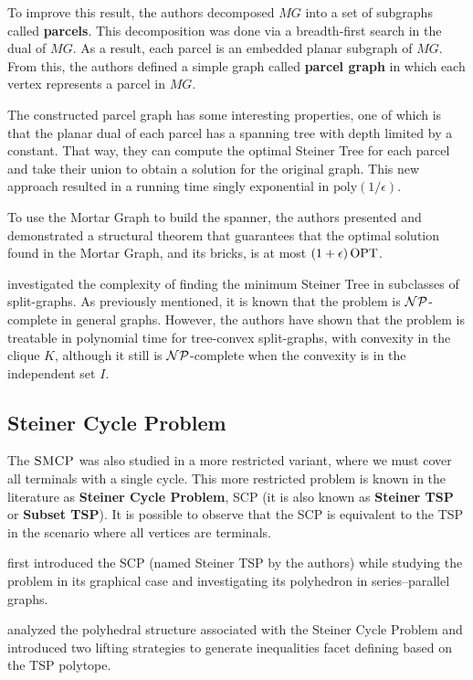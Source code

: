 To improve this result, the authors decomposed \(MG\) into a set of subgraphs called \textbf{parcels}. This decomposition was done via a breadth-first search in the dual of \(MG\). As a result, each parcel is an embedded planar subgraph of \(MG\). From this, the authors defined a simple graph called \textbf{parcel graph} in which each vertex represents a parcel in \(MG\).

The constructed parcel graph has some interesting properties, one of which is that the planar dual of each parcel has a spanning tree with depth limited by a constant. That way, they can compute the optimal Steiner Tree for each parcel and take their union to obtain a solution for the original graph. This new approach resulted in a running time singly exponential in \(\mathrm{poly}(1 / \epsilon)\).

To use the Mortar Graph to build the spanner, the authors presented and demonstrated a structural theorem that guarantees that the optimal solution found in the Mortar Graph, and its bricks, is at most \((1 + \epsilon) \operatorname{\textrm{OPT}}\).

\cite{split-graphs} investigated the complexity of finding the minimum Steiner Tree in subclasses of split-graphs. As previously mentioned, it is known that the problem is \(\mathcal{NP}\)-complete in general graphs. However, the authors have shown that the problem is treatable in polynomial time for tree-convex split-graphs, with convexity in the clique \(K\), although it still is \(\mathcal{NP}\)-complete when the convexity is in the independent set \(I\).


\subsection{Steiner Cycle Problem}

The \(\textsc{SMCP}\) was also studied in a more restricted variant, where we must cover all terminals with a single cycle. This more restricted problem is known in the literature as \textbf{Steiner Cycle Problem}, SCP (it is also known as \textbf{Steiner TSP} or \textbf{Subset TSP}). It is possible to observe that the SCP is equivalent to the TSP in the scenario where all vertices are terminals.

\cite{Cornuejols1985} first introduced the SCP (named Steiner TSP by the authors) while studying the problem in its graphical case and investigating its polyhedron in series–parallel graphs.

\cite{SalazarSteinerCycle} analyzed the polyhedral structure associated with the Steiner Cycle Problem and introduced two lifting strategies to generate inequalities facet defining based on the TSP polytope.

